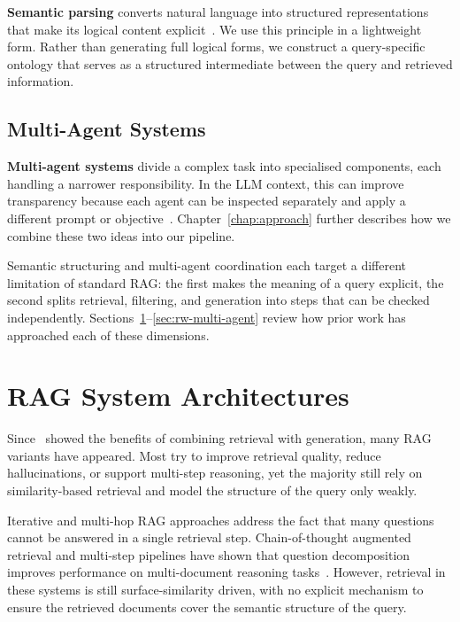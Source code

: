 \textbf{Semantic parsing} converts natural language into structured representations that make its logical content explicit~\citep{berant2013semantic}. We use this principle in a lightweight form. Rather than generating full logical forms, we construct a query-specific ontology that serves as a structured intermediate between the query and retrieved information.

\subsection{Multi-Agent Systems}

\textbf{Multi-agent systems} divide a complex task into specialised components, each handling a narrower responsibility. In the LLM context, this can improve transparency because each agent can be inspected separately and apply a different prompt or objective~\citep{pan2023multiagent}. Chapter~\ref{chap:approach} further describes how we combine these two ideas into our pipeline.

\bigskip
\noindent Semantic structuring and multi-agent coordination each target a different limitation of standard RAG: the first makes the meaning of a query explicit, the second splits retrieval, filtering, and generation into steps that can be checked independently. Sections~\ref{sec:rw-rag-architectures}--\ref{sec:rw-multi-agent} review how prior work has approached each of these dimensions.


\section{RAG System Architectures}
\label{sec:rw-rag-architectures}

Since~\citet{lewis2020retrieval} showed the benefits of combining retrieval with generation, many RAG variants have appeared. Most try to improve retrieval quality, reduce hallucinations, or support multi-step reasoning, yet the majority still rely on similarity-based retrieval and model the structure of the query only weakly.

Iterative and multi-hop RAG approaches address the fact that many questions cannot be answered in a single retrieval step. Chain-of-thought augmented retrieval and multi-step pipelines have shown that question decomposition improves performance on multi-document reasoning tasks~\citep{trivedi2023ircot}. However, retrieval in these systems is still surface-similarity driven, with no explicit mechanism to ensure the retrieved documents cover the semantic structure of the query.


